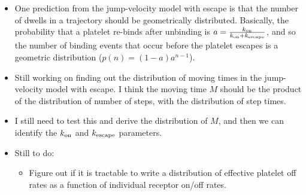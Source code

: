 \documentclass{article}
\newcommand{\tn}{\textnormal}
\begin{document}
\begin{itemize}
\item One prediction from the jump-velocity model with escape is that
  the number of dwells in a trajectory should be geometrically
  distributed. Basically, the probability that a platelet re-binds
  after unbinding is $a = \frac{k_\tn{on}}{k_\tn{on} + k_\tn{escape}}$,
  and so the number of binding events that occur before the platelet
  escapes is a geometric distribution ($p(n) = (1 - a) a^{n-1}$).
\item Still working on finding out the distribution of moving times in
  the jump-velocity model with escape. I think the moving time $M$
  should be the product of the distribution of number of steps, with
  the distribution of step times.
\item I still need to test this and derive the distribution of $M$,
  and then we can identify the $k_\tn{on}$ and $k_\tn{escape}$
  parameters.
\item Still to do:
  \begin{itemize}
  \item Figure out if it is tractable to write a distribution of
    effective platelet off rates as a function of individual receptor
    on/off rates.
  \end{itemize}

\end{itemize}

\end{document}
